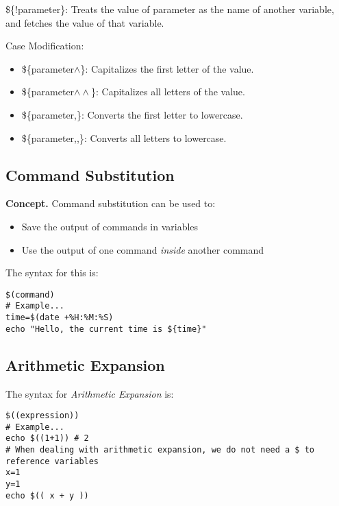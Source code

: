 \documentclass{report}
\begin{document}
    \begin{itemize}
        \$\{!parameter\}: Treats the value of parameter as the name of another variable, and fetches the value of that variable.
    \end{itemize}
    \bigbreak \noindent 
    Case Modification:
    \begin{itemize}
        \item \$\{parameter$\land$\}: Capitalizes the first letter of the value.
        \item \$\{parameter$\land\land$\}: Capitalizes all letters of the value.
        \item \$\{parameter,\}: Converts the first letter to lowercase.
        \item \$\{parameter,,\}: Converts all letters to lowercase.
    \end{itemize}

    \pagebreak \bigbreak \noindent 
    \subsection{Command Substitution}
    \bigbreak \noindent 
    \textbf{Concept.} Command substitution can be used to:
    \begin{itemize}
        \item Save the output of commands in variables
        \item Use the output of one command \textit{inside} another command
    \end{itemize}
    \bigbreak \noindent 
    The syntax for this is:
    \begin{mdframed}[style=purplebox]
    \begin{verbatim}
$(command)
# Example...
time=$(date +%H:%M:%S)
echo "Hello, the current time is ${time}"
    \end{verbatim}
    \bigbreak \noindent
    \end{mdframed}

    \bigbreak \noindent 
    \subsection{Arithmetic Expansion}
    \bigbreak \noindent 
    The syntax for \textit{Arithmetic Expansion} is:
    \begin{mdframed}[style=purplebox]
    \begin{verbatim}
$((expression))
# Example...
echo $((1+1)) # 2
# When dealing with arithmetic expansion, we do not need a $ to reference variables
x=1
y=1
echo $(( x + y ))
    \end{verbatim}
    \bigbreak \noindent
    \end{mdframed}
    
\end{document}

